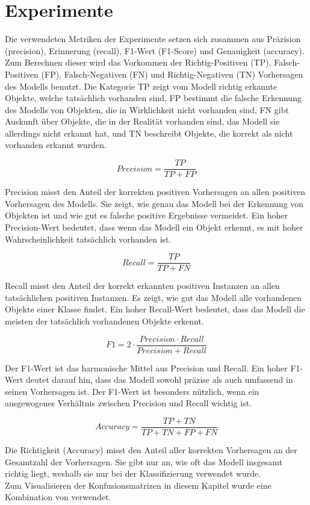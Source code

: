 \chapter{Experimente}
\label{ch:experimente}

Die verwendeten Metriken der Experimente setzen sich zusammen aus Präzision (precision), Erinnerung (recall), F1-Wert (F1-Score) und Genauigkeit (accuracy). Zum Berechnen dieser wird das Vorkommen der Richtig-Positiven (TP), Falsch-Positiven (FP), Falsch-Negativen (FN) und Richtig-Negativen (TN) Vorhersagen des Modells benutzt. Die Kategorie TP zeigt vom Modell richtig erkannte Objekte, welche tatsächlich vorhanden sind, FP bestimmt die falsche Erkennung des Modells von Objekten, die in Wirklichkeit nicht vorhanden sind, FN gibt Auskunft über Objekte, die in der Realität vorhanden sind, das Modell sie allerdings nicht erkannt hat, und TN beschreibt Objekte, die korrekt als nicht vorhanden erkannt wurden.

\[Precision = \frac{TP}{TP + FP}\]

Precision misst den Anteil der korrekten positiven Vorhersagen an allen positiven Vorhersagen des Modells. Sie zeigt, wie genau das Modell bei der Erkennung von Objekten ist und wie gut es falsche positive Ergebnisse vermeidet. Ein hoher Precision-Wert bedeutet, dass wenn das Modell ein Objekt erkennt, es mit hoher Wahrscheinlichkeit tatsächlich vorhanden ist.

\[Recall = \frac{TP}{TP + FN}\]

Recall misst den Anteil der korrekt erkannten positiven Instanzen an allen tatsächlichen positiven Instanzen. Es zeigt, wie gut das Modell alle vorhandenen Objekte einer Klasse findet. Ein hoher Recall-Wert bedeutet, dass das Modell die meisten der tatsächlich vorhandenen Objekte erkennt.

\[F1 = 2 \cdot \frac{Precision \cdot Recall}{Precision + Recall}\]

Der F1-Wert ist das harmonische Mittel aus Precision und Recall. Ein hoher F1-Wert deutet darauf hin, dass das Modell sowohl präzise als auch umfassend in seinen Vorhersagen ist. Der F1-Wert ist besonders nützlich, wenn ein ausgewogenes Verhältnis zwischen Precision und Recall wichtig ist.

\[Accuracy = \frac{TP + TN}{TP + TN + FP + FN}\]

Die Richtigkeit (Accuracy) misst den Anteil aller korrekten Vorhersagen an der Gesamtzahl der Vorhersagen. Sie gibt nur an, wie oft das Modell insgesamt richtig liegt, weshalb sie nur bei der Klassifizierung verwendet wurde.
\\
Zum Visualisieren der Konfusionsmatrizen in diesem Kapitel wurde eine Kombination von \cite{2020SciPy-NMeth, DamianoP2024confusionMatrixGenerator} verwendet.

